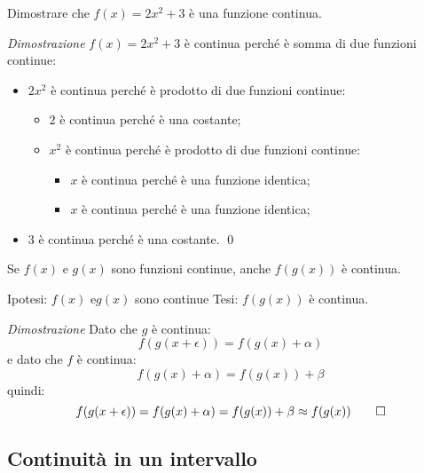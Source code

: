 \begin{esempio}
 Dimostrare che \(f(x)=2x^2 + 3\) è una funzione continua.

\emph{Dimostrazione}
\(f(x)=2x^2 + 3\) è continua perché è somma di due funzioni continue: 
 \begin{itemize}[noitemsep]
  \item \(2x^2\) è continua perché è prodotto di due funzioni continue:
  \begin{itemize}[nosep]
   \item \(2\) è continua perché è una costante;
   \item \(x^2\) è continua perché è prodotto di due funzioni continue:
   \begin{itemize}[nosep]
    \item \(x\) è continua perché è una funzione identica;
    \item \(x\) è continua perché è una funzione identica;
   \end{itemize}
  \end{itemize}
  \item \(3\) è continua perché è una costante. \qed
 \end{itemize}
\end{esempio}


\begin{teorema}
Se \(f(x)\) e \(g(x)\) sono funzioni continue, anche \(f(g(x))\) è continua.
\end{teorema}

\noindent Ipotesi: 
\(f(x) \text{ e} g(x)\) sono continue
\tab Tesi: 
\(f(g(x))\) è continua.

\emph{Dimostrazione}
Dato che \(g\) è continua: 
\[f(g(x+\epsilon)) = f(g(x)+\alpha)\]
e dato che \(f\) è continua: 
\[f(g(x)+\alpha)=f(g(x))+\beta\]
quindi: 
\[f(g(x+\epsilon)) = f(g(x)+\alpha) = f(g(x))+\beta \approx f(g(x)) \qed\]

\subsection{Continuità in un intervallo}
\label{subsec:cont_definizione}

